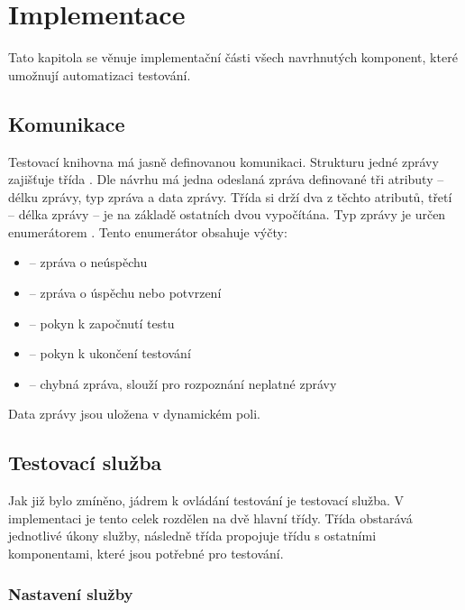 \chapter{Implementace}

Tato kapitola se věnuje implementační části všech navrhnutých komponent, které umožnují automatizaci testování.

\section{Komunikace}
Testovací knihovna má jasně definovanou komunikaci. Strukturu jedné zprávy zajišťuje třída . Dle návrhu má jedna odeslaná zpráva definované tři atributy -- délku zprávy, typ zpráva a data zprávy. Třída  si drží dva z těchto atributů, třetí -- délka zprávy -- je na základě ostatních dvou vypočítána. Typ zprávy je určen enumerátorem . Tento enumerátor obsahuje výčty:

\begin{itemize} 
    \item {} -- zpráva o neúspěchu
    \item {} -- zpráva o úspěchu nebo potvrzení
    \item {} -- pokyn k započnutí testu
    \item {} -- pokyn k ukončení testování
    \item {} -- chybná zpráva, slouží pro rozpoznání neplatné zprávy
\end{itemize}

Data zprávy jsou uložena v dynamickém poli. 



\section{Testovací služba}
Jak již bylo zmíněno, jádrem k ovládání testování je testovací služba. V implementaci je tento celek rozdělen na dvě hlavní třídy. Třída  obstarává jednotlivé úkony služby, následně třída  propojuje třídu  s ostatními komponentami, které jsou potřebné pro testování.

\subsection{Nastavení služby}

